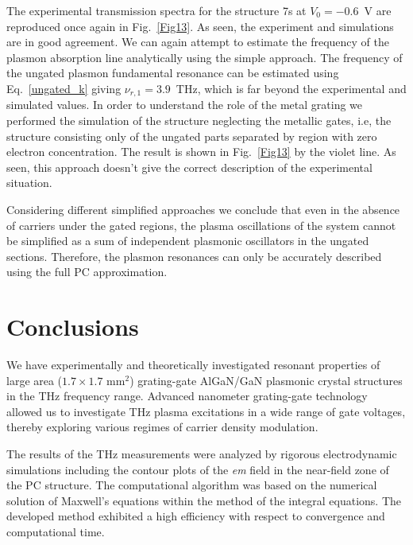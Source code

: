 \documentclass[%
 reprint,
 amsmath,amssymb,
 aps,
]{revtex4-2}
\def\red{\textcolor{red}}
\begin{document}
The experimental transmission spectra for the structure 7s at $V_0 = -0.6$~V are reproduced once again in Fig.~\ref{Fig13}. 
As seen, the experiment and simulations are in good agreement. 
We can again attempt to estimate the frequency of the plasmon absorption line analytically using the simple approach. 
The frequency of the ungated plasmon fundamental resonance can be estimated using Eq.~\ref{ungated_k} giving $\nu_{r, 1} = 3.9$~THz, which is far beyond the experimental and simulated values.
In order to understand the role of the metal grating we performed the simulation of the structure neglecting the metallic gates, i.e, the structure consisting only of the ungated parts separated by region with zero electron concentration. 
The result is shown in Fig.~\ref{Fig13} by the violet line. 
As seen, this approach doesn’t give the correct description of the experimental situation. 

Considering different simplified approaches we conclude that even in the absence of carriers under the gated regions, the plasma oscillations of the system cannot be simplified as a sum of independent plasmonic oscillators in the ungated sections. Therefore, the plasmon resonances can only be accurately described using the full PC approximation.


\section{Conclusions}\label{Sec6}

We have experimentally and theoretically investigated resonant properties of large area ($1.7 \times 1.7$ mm$^{2}$) grating-gate AlGaN/GaN plasmonic crystal structures in the THz frequency range. 
Advanced nanometer grating-gate technology allowed us to investigate THz plasma excitations in a wide range of gate voltages, thereby exploring various regimes of carrier density modulation.

The results of the THz measurements were analyzed by rigorous electrodynamic simulations including the contour plots of the \textit{em} field in the near-field zone of the PC structure. The computational algorithm was based on the numerical solution of Maxwell's equations within the method of the integral equations. 
The developed method exhibited a high efficiency with respect to convergence and computational time.%
\end{document}
